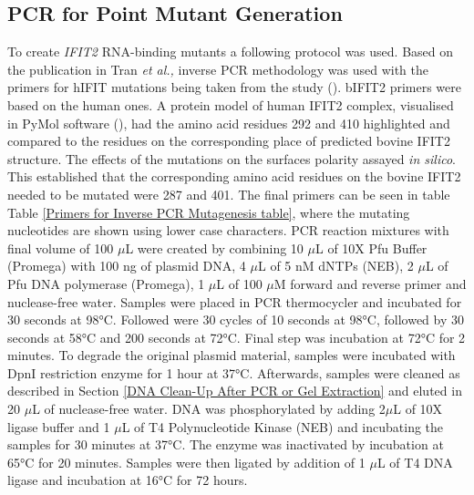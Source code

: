 \subsection{PCR for Point Mutant Generation} \label{PCR for Point Mutant Generation}
To create \textit{IFIT2} RNA-binding mutants a following protocol was used. Based on the publication in Tran \textit{et al.,} inverse PCR methodology was used with the primers for hIFIT mutations being taken from the study (\cite{Tran2020InfluenzaMRNAs}). bIFIT2 primers were based on the human ones. A protein model of human IFIT2 complex, visualised in PyMol software (\cite{SchrodingerTeam2023TheSystem}), had the amino acid residues 292 and 410 highlighted and compared to the residues on the corresponding place of predicted bovine IFIT2 structure. The effects of the mutations on the surfaces polarity assayed \textit{in silico}. This established that the corresponding amino acid residues on the bovine IFIT2 needed to be mutated were 287 and 401. The final primers can be seen in table Table \ref{Primers for Inverse PCR Mutagenesis table}, where the mutating nucleotides are shown using lower case characters.
PCR reaction mixtures with final volume of 100 \(\mu\)L were created by combining 10 \(\mu\)L of 10X Pfu Buffer (Promega) with 100 ng of plasmid DNA, 4 \(\mu\)L of 5 nM dNTPs (NEB), 2 \(\mu\)L of Pfu DNA polymerase (Promega), 1 \(\mu\)L of 100 \(\mu\)M forward and reverse primer and nuclease-free water. Samples were placed in PCR thermocycler and incubated for 30 seconds at 98°C. Followed were 30 cycles of 10 seconds at 98°C, followed by 30 seconds at 58°C and 200 seconds at 72°C. Final step was incubation at 72°C for 2 minutes. To degrade the original plasmid material, samples were incubated with DpnI restriction enzyme for 1 hour at 37°C. Afterwards, samples were cleaned as described in Section \ref{DNA Clean-Up After PCR or Gel Extraction} and eluted in 20 \(\mu\)L of nuclease-free water. DNA was phosphorylated by adding 2\(\mu\)L of 10X ligase buffer and 1 \(\mu\)L of T4 Polynucleotide Kinase (NEB) and incubating the samples for 30 minutes at 37°C. The enzyme was inactivated by incubation at 65°C for 20 minutes. Samples were then ligated by addition of 1 \(\mu\)L of T4 DNA ligase and incubation at 16°C for 72 hours.

